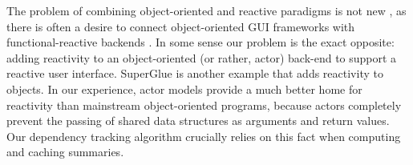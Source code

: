 The problem of combining object-oriented and reactive paradigms is not new \cite{Salvaneschi:2013:RBO:2451436.2451442}, as there is often a desire to connect object-oriented GUI frameworks with functional-reactive backends \cite{statelines}. In some sense our problem is the exact opposite: adding reactivity to an object-oriented (or rather, actor) back-end to support a reactive user interface.  SuperGlue \cite{superglue} is another example that adds reactivity to objects. In our experience, actor models provide a much better home for reactivity than mainstream object-oriented programs, because actors completely prevent the passing of shared data structures as arguments and return values. Our dependency tracking algorithm crucially relies on this fact when computing and caching summaries.







